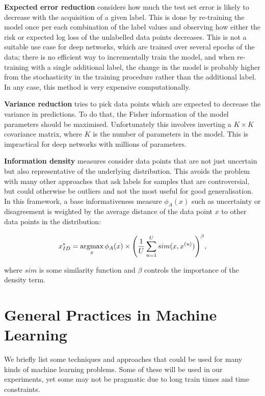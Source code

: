 \textbf{Expected error reduction} considers how much the test set error is likely to decrease with the acquisition of a given label.
This is done by re-training the model once per each combination of the label values and observing how either the risk or expected log loss of the unlabelled data points decreases.
This is not a suitable use case for deep networks, which are trained over several epochs of the data; there is no efficient way to incrementally train the model, and when re-training with a single additional label, the change in the model is probably higher from the stochasticity in the training procedure rather than the additional label.
In any case, this method is very expensive computationally.

\textbf{Variance reduction} tries to pick data points which are expected to decrease the variance in predictions.
To do that, the Fisher information of the model parameters should be maximised.
Unfortunately this involves inverting a $K \times K$ covariance matrix, where $K$ is the number of parameters in the model.
This is impractical for deep networks with millions of parameters.

\textbf{Information density} measures consider data points that are not just uncertain but also representative of the underlying distribution.
This avoids the problem with many other approaches that ask labels for samples that are controversial, but could otherwise be outliers and not the most useful for good generalisation.
In this framework, a base informativeness measure $\phi_A(x)$ such as uncertainty or disagreement is weighted by the average distance of the data point $x$ to other data points in the distribution:


\begin{equation}
 x^*_{ID} = \operatorname*{argmax}_x \phi_A(x) \times \Bigg( \frac{1}{U} \sum_{u=1}^U sim(x, x^{(u)}) \Bigg)^\beta,
\end{equation}

where $sim$ is some similarity function and $\beta$ controls the importance of the density term.

\section{General Practices in Machine Learning}
\label{bg_general}

We briefly list some techniques and approaches that could be used for many kinds of machine learning problems.
Some of these will be used in our experiments, yet some may not be pragmatic due to long train times and time constraints.

